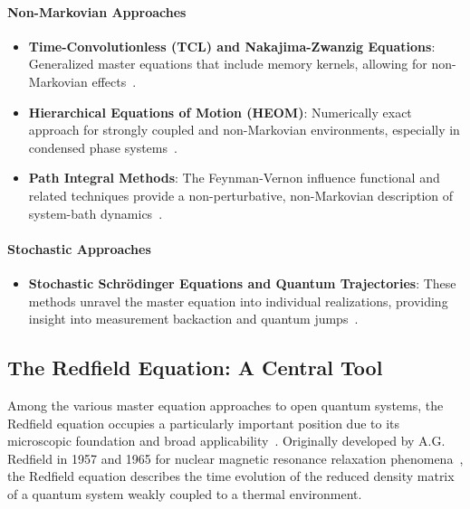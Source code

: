 \paragraph{Non-Markovian Approaches}
\begin{itemize}
    \item \textbf{Time-Convolutionless (TCL) and Nakajima-Zwanzig Equations}: Generalized master equations that include memory kernels, allowing for non-Markovian effects~\cite{BreuerPetruccione2009TheoryOpenQuantum, Rivas2014QuantumNonMarkovianityReview}.
    \item \textbf{Hierarchical Equations of Motion (HEOM)}: Numerically exact approach for strongly coupled and non-Markovian environments, especially in condensed phase systems~\cite{Tanimura2020HEOMReview}.
    \item \textbf{Path Integral Methods}: The Feynman-Vernon influence functional and related techniques provide a non-perturbative, non-Markovian description of system-bath dynamics~\cite{Weiss2012QuantumDissipativeSystems}.
\end{itemize}

\paragraph{Stochastic Approaches}
\begin{itemize}
    \item \textbf{Stochastic Schrödinger Equations and Quantum Trajectories}: These methods unravel the master equation into individual realizations, providing insight into measurement backaction and quantum jumps~\cite{BreuerPetruccione2009TheoryOpenQuantum, Carmichael1993OpenSystemsBook}.
\end{itemize}


\subsection{The Redfield Equation: A Central Tool}

Among the various master equation approaches to open quantum systems, the Redfield equation occupies a particularly important position due to its microscopic foundation and broad applicability~\cite{Redfield1965TheoryRelaxationProcesses, BreuerPetruccione2009TheoryOpenQuantum}. Originally developed by A.G. Redfield in 1957 and 1965 for nuclear magnetic resonance relaxation phenomena~\cite{Redfield1965TheoryRelaxationProcesses}, the Redfield equation describes the time evolution of the reduced density matrix of a quantum system weakly coupled to a thermal environment.

